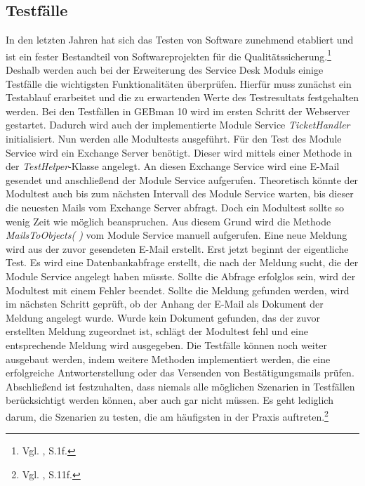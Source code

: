 \subsection{Testfälle}
\noindent
In den letzten Jahren hat sich das Testen von Software zunehmend etabliert und ist ein fester Bestandteil von Softwareprojekten für die Qualitätssicherung.\footnote{Vgl.\citeauthor{Vivenzio} \citeyear{Vivenzio}, S.1f.} Deshalb werden auch bei der Erweiterung des Service Desk Moduls einige Testfälle die wichtigsten Funktionalitäten überprüfen. Hierfür muss zunächst ein Testablauf erarbeitet und  die zu erwartenden Werte des Testresultats festgehalten werden.\newline
Bei den Testfällen in GEBman 10 wird im ersten Schritt der Webserver gestartet. Dadurch wird auch der implementierte Module Service \textit{TicketHandler} initialisiert. Nun werden alle Modultests ausgeführt. Für den Test des Module Service wird ein Exchange Server benötigt. Dieser wird mittels einer Methode in der \textit{TestHelper}-Klasse angelegt. An diesen Exchange Service wird eine E-Mail gesendet und anschließend der Module Service aufgerufen. Theoretisch könnte der Modultest auch bis zum nächsten Intervall des Module Service warten, bis dieser die neuesten Mails vom Exchange Server abfragt. Doch ein Modultest sollte so wenig Zeit wie möglich beanspruchen. Aus diesem Grund wird die Methode \textit{MailsToObjects( )} vom Module Service manuell aufgerufen. Eine neue Meldung wird aus der zuvor gesendeten E-Mail erstellt. Erst jetzt beginnt der eigentliche Test. Es wird eine Datenbankabfrage erstellt, die nach der Meldung sucht, die der Module Service angelegt haben müsste. Sollte die Abfrage erfolglos sein, wird der Modultest mit einem Fehler beendet. Sollte die Meldung gefunden werden, wird im nächsten Schritt geprüft, ob der Anhang der E-Mail als Dokument der Meldung angelegt wurde. Wurde kein Dokument gefunden, das der zuvor erstellten Meldung zugeordnet ist, schlägt der Modultest fehl und eine entsprechende Meldung wird ausgegeben.\newline
Die Testfälle können noch weiter ausgebaut werden, indem weitere Methoden implementiert werden, die eine erfolgreiche Antworterstellung oder das Versenden von Bestätigungsmails prüfen. Abschließend ist festzuhalten, dass niemals alle möglichen Szenarien in Testfällen berücksichtigt werden können, aber auch gar nicht müssen. Es geht lediglich darum, die Szenarien zu testen, die am häufigsten in der Praxis auftreten.\footnote{Vgl. \citeauthor{Witte} \citeyear{Witte}, S.11f.}\\


